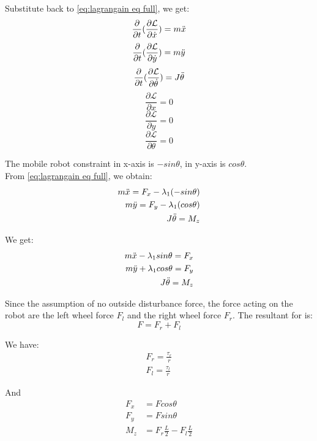 Substitute back to \ref{eq:lagrangain eq full}, we get:
\[\frac{\partial}{\partial t}(\frac{\partial \mathcal{L}}{\partial \Dot{x}}) = m\Ddot{x}\] 
\[\frac{\partial}{\partial t}(\frac{\partial \mathcal{L}}{\partial \Dot{y}}) = m\Ddot{y}\] 
\[\frac{\partial}{\partial t}(\frac{\partial \mathcal{L}}{\partial \Dot{\theta}}) = J\Ddot{\theta}\]
\[\frac{\partial \mathcal{L}}{\partial x} = 0\] 
\[\frac{\partial \mathcal{L}}{\partial y} = 0\] 
\[\frac{\partial \mathcal{L}}{\partial \theta} = 0\] 

The mobile robot constraint in x-axis is \(-sin\theta\), in y-axis is \(cos\theta\).\\
From \ref{eq:lagrangain eq full}, we obtain:
\begin{equation}
\begin{split}
m\Ddot{x} = F_x - \lambda_1(-sin\theta) \\
m\Ddot{y} = F_y - \lambda_1(cos\theta)\\
J\Ddot{\theta} = M_z
\end{split}
\end{equation}

We get:
\begin{equation}
\begin{split}
m\Ddot{x} - \lambda_1 sin \theta= F_x\\
m\Ddot{y} + \lambda_1 cos \theta= F_y\\
J\Ddot{\theta} = M_z
\end{split}
\end{equation}

Since the assumption of no outside disturbance force, the force acting on the robot are the left wheel force \(F_l\) and the right wheel force \(F_r\). The resultant for is:
\begin{equation}
F = F_r + F_l
\end{equation}

We have:
\begin{equation}
\begin{split}
F_r = \frac{\tau_r}{r}\\
F_l = \frac{\tau_l}{r}
\end{split}
\end{equation}

And
\begin{equation}
\begin{split}
F_x &= F cos\theta \\
F_y &= F sin\theta \\
M_z &= F_r \frac{L}{2} - F_l \frac{L}{2}
\end{split}
\end{equation}

